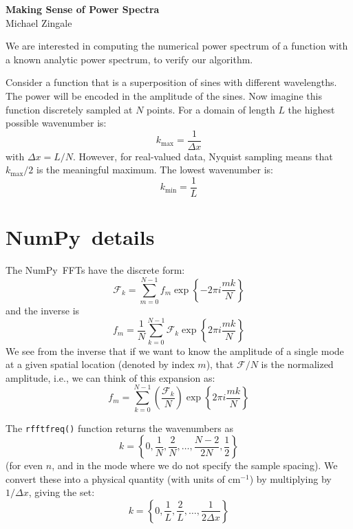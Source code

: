 \documentclass[11pt]{article}
\newcommand{\numpy}{{\sffamily NumPy}}
\begin{document}
\begin{center}
{\bfseries \sffamily \LARGE Making Sense of Power Spectra} \\
Michael Zingale
\end{center}

We are interested in computing the numerical power spectrum of a
function with a known analytic power spectrum, to verify our
algorithm.

Consider a function that is a superposition of sines with different
wavelengths.  The power will be encoded in the amplitude of the sines.
Now imagine this function discretely sampled at $N$ points.  For a domain of
length $L$ the highest possible wavenumber is:
\begin{equation}
k_\mathrm{max} = \frac{1}{\Delta x}
\end{equation}
with $\Delta x = L/N$.  However, for real-valued data, Nyquist sampling
means that $k_\mathrm{max}/2$ is the meaningful maximum.
The lowest wavenumber is:
\begin{equation}
k_\mathrm{min} = \frac{1}{L}
\end{equation}


\section*{\numpy\ details}

The \numpy\ FFTs have the discrete form:
\begin{equation}
\mathcal{F}_k = \sum_{m=0}^{N-1} f_m \exp \left \{ -2\pi i \frac{mk}{N} \right \}
\end{equation}
and the inverse is
\begin{equation}
f_m = \frac{1}{N} \sum_{k=0}^{N-1} \mathcal{F}_k \exp \left \{ 2\pi i \frac{mk}{N} \right \}
\end{equation}
We see from the inverse that if we want to know the amplitude of a single
mode at a given spatial location (denoted by index $m$), that $\mathcal{F}/N$
is the normalized amplitude, i.e., we can think of this expansion as:
\begin{equation}
f_m = \sum_{k=0}^{N-1} \left (\frac{\mathcal{F}_k}{N} \right )
    \exp \left \{ 2\pi i \frac{mk}{N} \right \}
\end{equation}


The {\tt rfftfreq()} function returns the wavenumbers as
\begin{equation}
k = \left \{ 0, \frac{1}{N}, \frac{2}{N}, \ldots, \frac{N-2}{2N}, \frac{1}{2} \right \}
\end{equation}
(for even $n$, and in the mode where we do not specify the sample spacing).
We convert these into a physical quantity (with units of cm$^{-1}$) by
multiplying by $1/\Delta x$, giving the set:
\begin{equation}
k = \left \{ 0, \frac{1}{L}, \frac{2}{L}, \ldots, \frac{1}{2\Delta x} \right \}
\end{equation}
\end{document}
